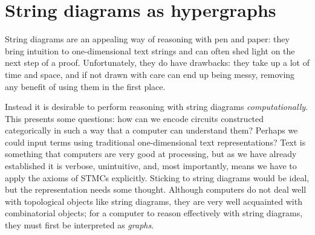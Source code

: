 \chapter{String diagrams as hypergraphs}\label{chap:hypergraphs}

String diagrams are an appealing way of reasoning with pen and paper: they bring
intuition to one-dimensional text strings and can often shed light on the
next step of a proof.
Unfortunately, they do have drawbacks: they take up a lot of time and space, and
if not drawn with care can end up being messy, removing any benefit of using
them in the first place.

Instead it is desirable to perform reasoning with string diagrams
\emph{computationally}.
This presents some questions: how can we encode circuits constructed
categorically in such a way that a computer can understand them?
Perhaps we could input terms using traditional one-dimensional text
representations?
Text is something that computers are very good at processing, but as we have
already established it is verbose, unintuitive, and, most importantly,
means we have to apply the axioms of STMCs explicitly.
Sticking to string diagrams would be ideal, but the representation
needs some thought.
Although computers do not deal well with topological objects like string
diagrams, they are very well acquainted with combinatorial objects; for
a computer to reason effectively with string diagrams, they must first be
interpreted as \emph{graphs}.








